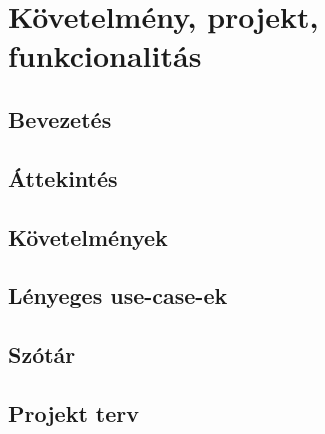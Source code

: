%
\chapter{Követelmény, projekt, funkcionalitás}

\thispagestyle{fancy}

\section{Bevezetés}









\section{Áttekintés}


\section{Követelmények}


\section{Lényeges use-case-ek}


\section{Szótár}


\section{Projekt terv}



